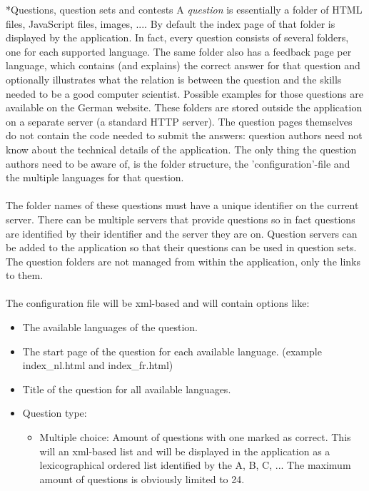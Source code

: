 \begin{section}*{Questions, question sets and contests}
	A \emph{question} is essentially a folder of HTML files, JavaScript files, images, ....
	By default the index page of that folder is displayed by the application. In fact,
	every question consists of several folders, one for each supported language. The same
	folder also has a feedback page per language, which contains (and explains) the
	correct answer for that question and optionally illustrates what the relation is
	between the question and the skills needed to be a good computer scientist.
	Possible examples for those questions are available on the German website.
	These folders are stored outside the application on a separate server (a standard
	HTTP server). The question pages themselves do not contain the code needed to submit
	the answers: question authors need not know about the technical details of the
	application. The only thing the question authors need to be aware of, is the folder
	structure, the 'configuration'-file and the multiple languages for that question. \\
	\\
	The folder names of these questions must have a unique identifier on the current
	server. There can be multiple servers that provide questions so in fact questions
	are identified by their identifier and the server they are on. Question servers can be
	added to the application so that their questions can be used in question sets. The
	question folders are not managed from within the application, only the links to them.
	\\
	\\
	The configuration file will be xml-based and will contain options like:
	\begin{itemize}
		\item The available languages of the question.
		\item The start page of the question for each available language.
		(example index_nl.html and index_fr.html)
  		\item Title of the question for all available languages.
  		\item Question type:
  		\begin{itemize}
  			\item Multiple choice: Amount of questions with one marked as correct.
  			This will an xml-based list and will be displayed in the application as a
  			lexicographical ordered list identified by the A, B, C, ...
  			The maximum amount of questions is obviously limited to 24.

\end{itemize}
\end{itemize}
\end{section}
